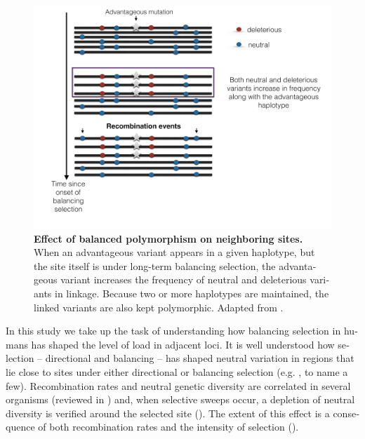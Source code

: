 \begin{refsection}
\begin{otherlanguage}{english}
\begin{figure}[ht]
\centering
\includegraphics[width=13 cm, keepaspectratio]
{chap3_folder/figures/FIG_1_chap2_tiny.png}
\caption{\textbf{Effect of balanced polymorphism on neighboring sites.} When an advantageous variant appears in a given haplotype, but the site itself is under long-term balancing selection, the advantageous variant increases the frequency of neutral and deleterious variants in linkage. Because two or more haplotypes are maintained, the linked variants are also kept polymorphic. Adapted from \textcite{Charlesworth2006}.}
\label{fig:schema}
\end{figure}

In this study we take up the task of understanding how  balancing selection in humans has shaped the level of load in adjacent loci. It is well understood how selection -- directional and balancing -- has shaped neutral variation in regions that lie close to sites under either directional or balancing selection (e.g. \cite{Charlesworth2006,Charlesworth2012,Cutter2013,Nielsen2005}, to name a few). Recombination rates and neutral genetic diversity are correlated in several organisms (reviewed in \cite{Charlesworth2012,Cutter2013}) and, when selective sweeps occur, a depletion of neutral diversity is verified around the selected site (\cite{Charlesworth2012,Cutter2013,Nielsen2005}). The extent of this effect is a consequence of both recombination rates and the intensity of selection (\cite{Roux2013,schierup2000effect,Charlesworth1997}).


\end{otherlanguage}
\end{refsection}
